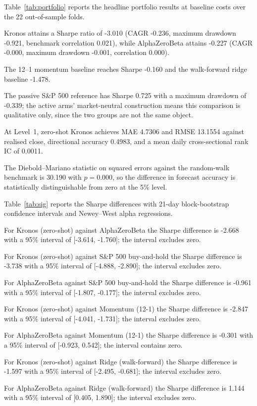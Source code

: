 \documentclass[conference]{IEEEtran}
\begin{document}
Table~\ref{tab:portfolio} reports the headline portfolio results at baseline costs over the 22 out-of-sample folds.

Kronos attains a Sharpe ratio of -3.010 (CAGR -0.236, maximum drawdown -0.921, benchmark correlation 0.021), while AlphaZeroBeta attains -0.227 (CAGR -0.000, maximum drawdown -0.001, correlation 0.000).

The 12--1 momentum baseline reaches Sharpe -0.160 and the walk-forward ridge baseline -1.478.

The passive S\&P 500 reference has Sharpe 0.725 with a maximum drawdown of -0.339; the active arms' market-neutral construction means this comparison is qualitative only, since the two groups are not the same object.

At Level~1, zero-shot Kronos achieves MAE 4.7306 and RMSE 13.1554 against realised close, directional accuracy 0.4983, and a mean daily cross-sectional rank IC of 0.0011.

The Diebold--Mariano statistic on squared errors against the random-walk benchmark is 30.190 with $p=0.000$, so the difference in forecast accuracy is statistically distinguishable from zero at the 5\% level.

Table~\ref{tab:sig} reports the Sharpe differences with 21-day block-bootstrap confidence intervals and Newey--West alpha regressions.

For Kronos (zero-shot) against AlphaZeroBeta the Sharpe difference is -2.668 with a 95\% interval of [-3.614, -1.760]; the interval excludes zero.

For Kronos (zero-shot) against S\&P 500 buy-and-hold the Sharpe difference is -3.738 with a 95\% interval of [-4.888, -2.890]; the interval excludes zero.

For AlphaZeroBeta against S\&P 500 buy-and-hold the Sharpe difference is -0.961 with a 95\% interval of [-1.807, -0.177]; the interval excludes zero.

For Kronos (zero-shot) against Momentum (12-1) the Sharpe difference is -2.847 with a 95\% interval of [-4.041, -1.731]; the interval excludes zero.

For AlphaZeroBeta against Momentum (12-1) the Sharpe difference is -0.301 with a 95\% interval of [-0.923, 0.542]; the interval contains zero.

For Kronos (zero-shot) against Ridge (walk-forward) the Sharpe difference is -1.597 with a 95\% interval of [-2.495, -0.681]; the interval excludes zero.

For AlphaZeroBeta against Ridge (walk-forward) the Sharpe difference is 1.144 with a 95\% interval of [0.405, 1.890]; the interval excludes zero.
\end{document}
